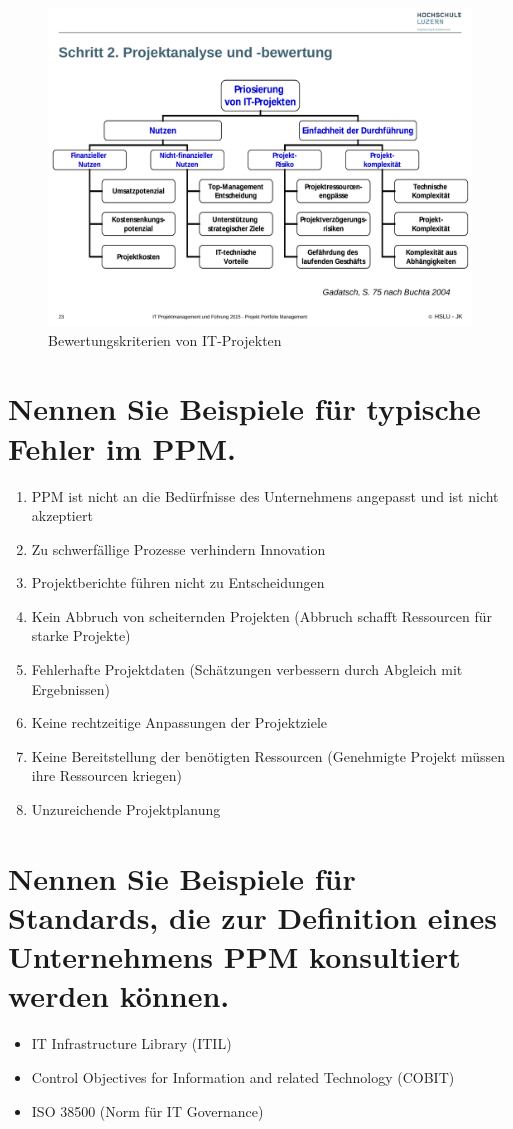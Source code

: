 \begin{figure}
\centering
\includegraphics[width=\linewidth]{fig/bewertung-it-projekt}
\caption{Bewertungskriterien von IT-Projekten}
\label{fig:bewertung-it-projekt}
\end{figure}

\section{Nennen Sie Beispiele für typische Fehler im PPM.}

\begin{enumerate}
	\item PPM ist nicht an die Bedürfnisse des Unternehmens angepasst und ist nicht akzeptiert
	\item Zu schwerfällige Prozesse verhindern Innovation
	\item Projektberichte führen nicht zu Entscheidungen
	\item Kein Abbruch von scheiternden Projekten (Abbruch schafft Ressourcen für starke Projekte)
	\item Fehlerhafte Projektdaten (Schätzungen verbessern durch Abgleich mit Ergebnissen)
	\item Keine rechtzeitige Anpassungen der Projektziele
	\item Keine Bereitstellung der benötigten Ressourcen (Genehmigte Projekt müssen ihre Ressourcen kriegen)
	\item Unzureichende Projektplanung
\end{enumerate}

\section{Nennen Sie Beispiele für Standards, die zur Definition eines Unternehmens PPM konsultiert werden können.}

\begin{itemize}
	\item IT Infrastructure Library (ITIL)
	\item Control Objectives for Information and related Technology (COBIT)
	\item ISO 38500 (Norm für IT Governance)
\end{itemize}